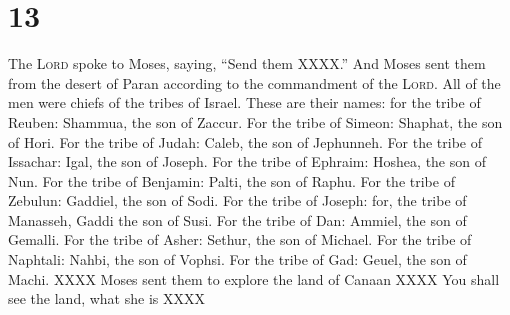 \section{13}\label{Numbers 13}
\begin{enumerate}[align=center]
     The \textsc{Lord} spoke to Moses, saying,%
     ``Send them XXXX.''%
     And Moses sent them from the desert of Paran according to the commandment of the \textsc{Lord}. All of the men were chiefs of the tribes of Israel.%
     These are their names: for the tribe of Reuben: Shammua, the son of Zaccur.%
     For the tribe of Simeon: Shaphat, the son of Hori.%
     For the tribe of Judah: Caleb, the son of Jephunneh.%
     For the tribe of Issachar: Igal, the son of Joseph.%
     For the tribe of Ephraim: Hoshea, the son of Nun.%
     For the tribe of Benjamin: Palti, the son of Raphu.%
     For the tribe of Zebulun: Gaddiel, the son of Sodi.%
     For the tribe of Joseph: for, the tribe of Manasseh, Gaddi the son of Susi.%
     For the tribe of Dan: Ammiel, the son of Gemalli.%
     For the tribe of Asher: Sethur, the son of Michael.%
     For the tribe of Naphtali: Nahbi, the son of Vophsi.%
     For the tribe of Gad: Geuel, the son of Machi.%
     XXXX%
     Moses sent them to explore the land of Canaan XXXX%
     You shall see the land, what she is XXXX%
\end{enumerate}
